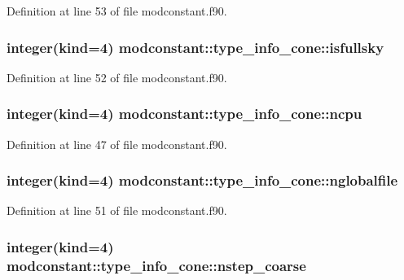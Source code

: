 Definition at line 53 of file modconstant.\-f90.

\hypertarget{structmodconstant_1_1type__info__cone_a088d6561f49af5196c4bd87190c60ee1}{
\subsubsection[{isfullsky}]{\setlength{\rightskip}{0pt plus 5cm}integer(kind=4) modconstant\-::type\-\_\-info\-\_\-cone\-::isfullsky}}\label{structmodconstant_1_1type__info__cone_a088d6561f49af5196c4bd87190c60ee1}


Definition at line 52 of file modconstant.\-f90.

\hypertarget{structmodconstant_1_1type__info__cone_a043cafa84fa677b3d924c69fa9808dd5}{
\subsubsection[{ncpu}]{\setlength{\rightskip}{0pt plus 5cm}integer(kind=4) modconstant\-::type\-\_\-info\-\_\-cone\-::ncpu}}\label{structmodconstant_1_1type__info__cone_a043cafa84fa677b3d924c69fa9808dd5}


Definition at line 47 of file modconstant.\-f90.

\hypertarget{structmodconstant_1_1type__info__cone_a792bb4b0eeea2cef9d4edd825540396f}{
\subsubsection[{nglobalfile}]{\setlength{\rightskip}{0pt plus 5cm}integer(kind=4) modconstant\-::type\-\_\-info\-\_\-cone\-::nglobalfile}}\label{structmodconstant_1_1type__info__cone_a792bb4b0eeea2cef9d4edd825540396f}


Definition at line 51 of file modconstant.\-f90.

\hypertarget{structmodconstant_1_1type__info__cone_a9790d17feaf56655b080296bcccc2e36}{
\subsubsection[{nstep\-\_\-coarse}]{\setlength{\rightskip}{0pt plus 5cm}integer(kind=4) modconstant\-::type\-\_\-info\-\_\-cone\-::nstep\-\_\-coarse}}\label{structmodconstant_1_1type__info__cone_a9790d17feaf56655b080296bcccc2e36}


